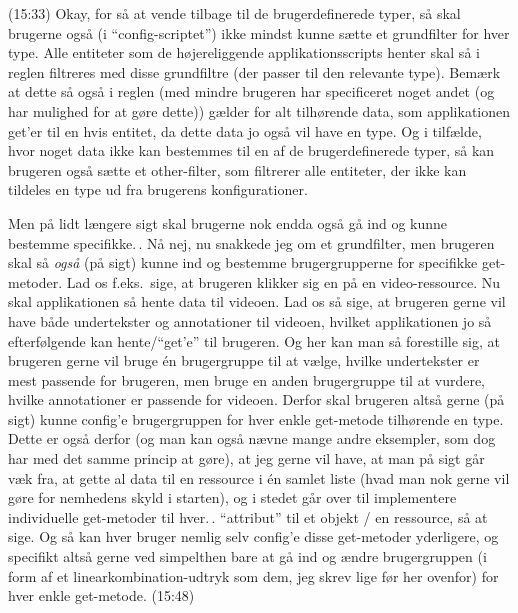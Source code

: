 \documentclass{report}
\begin{document}

(15:33) Okay, for så at vende tilbage til de brugerdefinerede typer, så skal brugerne også (i ``config-scriptet'') ikke mindst kunne sætte et grundfilter for hver type. Alle entiteter som de højereliggende applikationsscripts henter skal så i reglen filtreres med disse grundfiltre (der passer til den relevante type). Bemærk at dette så også i reglen (med mindre brugeren har specificeret noget andet (og har mulighed for at gøre dette)) gælder for alt tilhørende data, som applikationen get'er til en hvis entitet, da dette data jo også vil have en type. Og i tilfælde, hvor noget data ikke kan bestemmes til en af de brugerdefinerede typer, så kan brugeren også sætte et other-filter, som filtrerer alle entiteter, der ikke kan tildeles en type ud fra brugerens konfigurationer. 

Men på lidt længere sigt skal brugerne nok endda også gå ind og kunne bestemme specifikke.\,. Nå nej, nu snakkede jeg om et grundfilter, men brugeren skal så \emph{også} (på sigt) kunne ind og bestemme brugergrupperne for specifikke get-metoder. Lad os f.eks.\ sige, at brugeren klikker sig en på en video-ressource. Nu skal applikationen så hente data til videoen. Lad os så sige, at brugeren gerne vil have både undertekster og annotationer til videoen, hvilket applikationen jo så efterfølgende kan hente/``get'e'' til brugeren. Og her kan man så forestille sig, at brugeren gerne vil bruge én brugergruppe til at vælge, hvilke undertekster er mest passende for brugeren, men bruge en anden brugergruppe til at vurdere, hvilke annotationer er passende for videoen. Derfor skal brugeren altså gerne (på sigt) kunne config'e brugergruppen for hver enkle get-metode tilhørende en type. Dette er også derfor (og man kan også nævne mange andre eksempler, som dog har med det samme princip at gøre), at jeg gerne vil have, at man på sigt går væk fra, at gette al data til en ressource i én samlet liste (hvad man nok gerne vil gøre for nemhedens skyld i starten), og i stedet går over til implementere individuelle get-metoder til hver.\,. ``attribut'' til et objekt / en ressource, så at sige. Og så kan hver bruger nemlig selv config'e disse get-metoder yderligere, og specifikt altså gerne ved simpelthen bare at gå ind og ændre brugergruppen (i form af et linearkombination-udtryk som dem, jeg skrev lige før her ovenfor) for hver enkle get-metode. (15:48)
\end{document}
